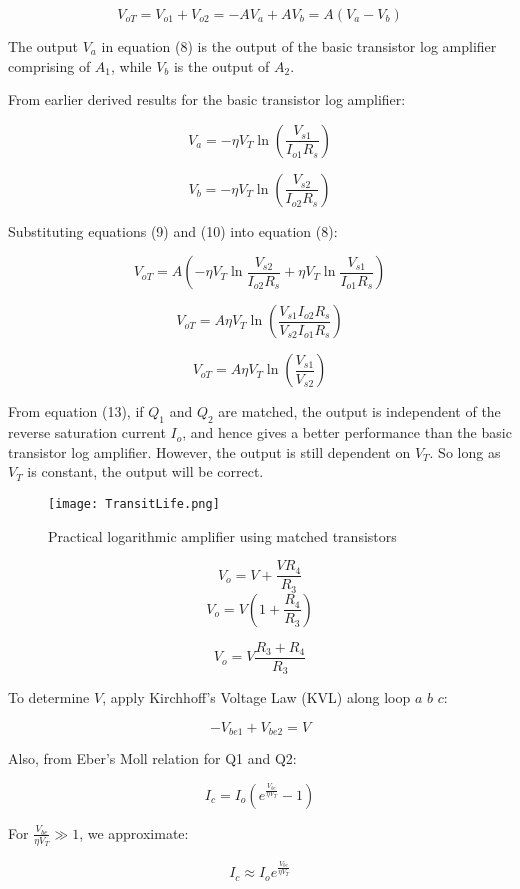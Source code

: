 \documentclass[a4paper,9pt,twoside,openany,twocolumn]{memoir}
\begin{document}
\[
V_{oT} = V_{o1} + V_{o2} = - A V_a + A V_b = A (V_a - V_b) \tag{8}
\]

The output \( V_a \) in equation (8) is the output of the basic transistor log amplifier comprising of \( A_1 \), while \( V_b \) is the output of \( A_2 \).

From earlier derived results for the basic transistor log amplifier:

\[
V_a = - \eta V_T \ln \left( \frac{V_{s1}}{I_{o1} R_s} \right) \tag{9}
\]

\[
V_b = - \eta V_T \ln \left( \frac{V_{s2}}{I_{o2} R_s} \right) \tag{10}
\]

Substituting equations (9) and (10) into equation (8):

\[
V_{oT} = A \left( - \eta V_T \ln \frac{V_{s2}}{I_{o2} R_s} + \eta V_T \ln \frac{V_{s1}}{I_{o1} R_s} \right) \tag{11}
\]

\[
V_{oT} = A \eta V_T \ln \left( \frac{V_{s1} I_{o2} R_s}{V_{s2} I_{o1} R_s} \right) \tag{12}
\]

\[
V_{oT} = A \eta V_T \ln \left( \frac{V_{s1}}{V_{s2}} \right) \tag{13}
\]

From equation (13), if \( Q_1 \) and \( Q_2 \) are matched, the output is independent of the reverse saturation current \( I_o \), and hence gives a better performance than the basic transistor log amplifier. However, the output is still dependent on \( V_T \). So long as \( V_T \) is constant, the output will be correct.
\begin{figure}[H]
    \centering
    \texttt{[image: TransitLife.png]}
    \caption{Practical logarithmic amplifier using matched transistors}
    \label{fig:question_image}
\end{figure}


\[
V_o = V + \frac{V R_4}{R_3} \tag{1}
\]
\[
V_o = V \left( 1 + \frac{R_4}{R_3} \right) \tag{2}
\]

\[
V_o = V \frac{R_3 + R_4}{R_3} \tag{3}
\]

To determine \( V \), apply Kirchhoff's Voltage Law (KVL) along loop \( a \) \( b \) \( c \):

\[
-V_{be1} + V_{be2} = V \tag{1a}
\]

Also, from Eber's Moll relation for Q1 and Q2:

\[
I_c = I_o \left( e^{\frac{V_{be}}{\eta V_T}} - 1 \right) \tag{2}
\]

For \( \frac{V_{be}}{\eta V_T} \gg 1 \), we approximate:

\[
I_c \approx I_o e^{\frac{V_{be}}{\eta V_T}} \tag{3}
\]
\end{document}
